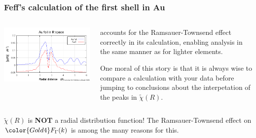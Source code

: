 \documentclass[10pt, xcolor=x11names, compress]{beamer}
\begin{document}
\begin{frame}
  \frametitle{Feff's calculation of the first shell in Au}
  \begin{columns}
    \begin{column}{0.5\linewidth}
      \includegraphics[width=\linewidth]{Au+path.png}
    \end{column}
    \begin{column}{0.5\linewidth}
      {\feff} accounts for the Ramsauer-Townsend effect correctly in
      its calculation, enabling analysis in the same manner as for
      lighter elements.

      \bigskip

      One moral of this story is that it is always wise to compare a
      {\feff} calculation with your data before jumping to conclusions
      about the interpetation of the peaks in $\tilde\chi(R)$.
    \end{column}
  \end{columns}

  \bigskip

  \begin{alertblock}{$\tilde\chi(R)$ is \textbf{NOT} a radial distribution function!}
    The Ramsauer-Townsend effect on ${\color{Gold4}F_\Gamma(k)}$ is
    among the many reasons for this.
  \end{alertblock}
\end{frame}
\end{document}

